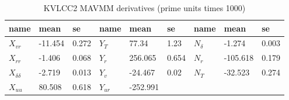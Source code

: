 \begin{table}[!htb]
    \footnotesize
    \centering
        \caption{KVLCC2 MAVMM derivatives (prime units times 1000)}
    \label{\detokenize{06.20_results_kvlcc2:kvlcc2-derivatives}}
    \begin{tabular}{|T|T|T|T|T|T|T|T|T|}
\hline


name
&

mean
&

se
&

name
&

mean
&

se
&

name
&

mean
&

se
\\
\hline

\( X_{vr} \)
&

-11.454
&

0.272
&

\( Y_{T} \)
&

77.34
&

1.23
&

\( N_{\delta} \)
&

-1.274
&

0.003
\\


\( X_{rr} \)
&

-1.406
&

0.068
&

\( Y_{r} \)
&

256.065
&

0.654
&

\( N_{r} \)
&

-105.618
&

0.179
\\


\( X_{\delta\delta} \)
&

-2.719
&

0.013
&

\( Y_{v} \)
&

-24.467
&

0.02
&

\( N_{T} \)
&

-32.523
&

0.274
\\


\( X_{uu} \)
&

80.508
&

0.618
&

\( Y_{ur} \)
&

-252.991
&


\end{tabular}
\end{table}
